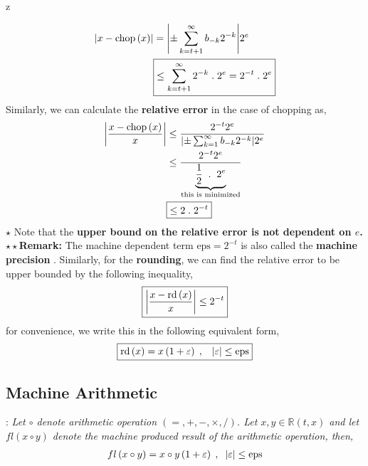 z\documentclass[a4paper,12pt,twoside]{book}
\newcommand{\defin}[0]{\boxed{\textbf{\textit{Definition}}}}
\DeclarePairedDelimiter\abs{\lvert}{\rvert}
\begin{document}
\begin{equation}
	\begin{split}
		\abs{x - \text{chop}\left( x \right) } &=  \abs*{\pm \sum_{k=t+1}^{\infty} b_{-k}2^{-k}}2^{e}\\
		&\boxed{\le \sum_{k=t+1}^{\infty} 2^{-k} \;.\; 2^{e} = 2^{-t}\;.\;2^{e}} 
	\end{split}
\end{equation}
Similarly, we can calculate the \textbf{relative error} in the case of chopping as,
\begin{equation}
	\begin{split}
		\abs*{\frac{x-\text{chop}\left( x \right) }{x}} &\le \frac{2^{-t}2^{e}}{\abs*{\pm \sum_{k=1}^{\infty} b_{-k}2^{-k}}2^{e}} \\
		&\le \frac{2^{-t}2^{e}}{ \underbrace{\frac{1}{2}\;\;.\;\;2^{e}}_{\text{this is minimized}}}\\
		&\boxed{\le 2 \;.\; 2^{-t}}
	\end{split}
\end{equation}
$\star$ Note that the \textbf{upper bound on the relative error is not dependent on $e$.}
\newline\newline
$\star\star$\textbf{Remark: }The machine dependent term $\boxed{\text{eps} = 2^{-t}}$ is also called the \textbf{machine precision} . 
\newline\newline
Similarly, for the \textbf{rounding}, we can find the relative error to be upper bounded by the following inequality,
\begin{equation}
	\begin{split}
		\boxed{\abs*{\frac{x - \text{rd}\left( x \right) }{x}}\le 2^{-t}}
	\end{split}
\end{equation}
for convenience, we write this in the following equivalent form,
\begin{equation}
	\begin{split}
		\boxed{\text{rd}\left( x \right) = x\left( 1+\varepsilon \right)\;,\;\;\;\abs*{\varepsilon} \le \text{eps}} 
	\end{split}
\end{equation}
\subsection{Machine Arithmetic}
\defin  : \textit{Let $\circ$ denote arithmetic operation $\left( =,+,-,\times ,/ \right) $. Let $x,y \in \mathbb{R}\left( t,x \right) $ and let $fl\left( x\circ y \right) $ denote the machine produced result of the arithmetic operation, then,
\begin{equation}
	\begin{split}
		fl\left( x\circ y \right) = x \circ y\left( 1+\varepsilon \right) \;,\;\;\abs{\varepsilon} \le \text{eps}
	\end{split}
\end{equation}
}
\end{document}
